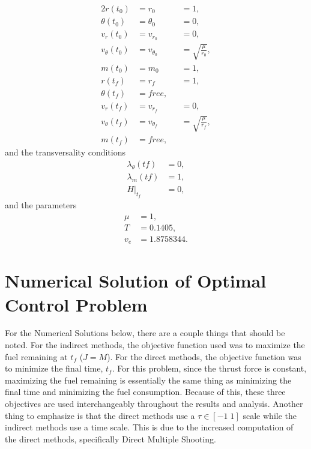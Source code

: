 \documentclass[]{article}
\begin{document}
\begin{alignat*}{2}                                                                                                                                                                        
r(t_0)          &= r_0          &  &= 1, \\
\theta(t_0)     &= \theta_0     &  &= 0, \\
v_r(t_0)        &= v_{r_0}      &  &= 0, \\
v_{\theta}(t_0) &= v_{\theta_0} &  &= \sqrt{\frac{\mu}{r_0}}, \\
m(t_0)          &= m_0          &  &= 1,\\
r(t_f)          &= r_f          &  &= 1,\\
\theta(t_f)     &= free,        &  & \\
v_r(t_f)        &= v_{r_f}      &  &= 0, \\
v_{\theta}(t_f) &= v_{\theta_f} &  &=\sqrt{\frac{\mu}{r_f}},\\
m(t_f)          &= free,         &  & 
\end{alignat*}
and the transversality conditions
\begin{align*}
	\lambda_\theta(tf) &= 0, \\
	\lambda_m(tf) &= 1, \\
	H|_{t_f}   &= 0,
\end{align*}
and the parameters
\begin{align*}
	\mu &= 1, \\
	T   &= 0.1405, \\
	v_e &= 1.8758344.
\end{align*}

\section{Numerical Solution of Optimal Control Problem}
For the Numerical Solutions below, there are a couple things that should be noted. For the indirect methods, the objective function used was to maximize the fuel remaining at \(t_f\) (\(J = M\)). For the direct methods, the objective function was to minimize the final time, \(t_f\). For this problem, since the thrust force is constant, maximizing the fuel remaining is essentially the same thing as minimizing the final time and minimizing the fuel consumption. Because of this, these three objectives are used interchangeably throughout the results and analysis. Another thing to emphasize is that the direct methods use a \(\tau \in [-1\; 1]\) scale while the indirect methods use a time scale. This is due to the increased computation of the direct methods, specifically Direct Multiple Shooting.
\end{document}
